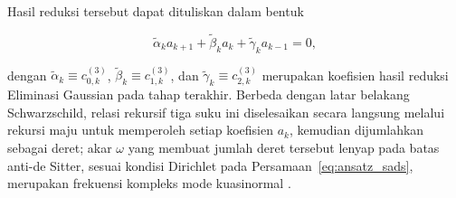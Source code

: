 Hasil reduksi tersebut dapat dituliskan dalam bentuk

\begin{equation}
    \tilde{\alpha}_k a_{k+1}
    +
    \tilde{\beta}_k a_k
    +
    \tilde{\gamma}_k a_{k-1}
    =0,
\end{equation}

dengan $\tilde{\alpha}_k \equiv c_{0,k}^{(3)}$, $\tilde{\beta}_k \equiv c_{1,k}^{(3)}$, dan $\tilde{\gamma}_k \equiv c_{2,k}^{(3)}$ merupakan koefisien hasil reduksi Eliminasi Gaussian pada tahap terakhir. Berbeda dengan latar belakang Schwarzschild, relasi rekursif tiga suku ini diselesaikan secara langsung melalui rekursi maju untuk memperoleh setiap koefisien $a_k$, kemudian dijumlahkan sebagai deret; akar $\omega$ yang membuat jumlah deret tersebut lenyap pada batas anti-de Sitter, sesuai kondisi Dirichlet pada Persamaan~\eqref{eq:ansatz_sads}, merupakan frekuensi kompleks mode kuasinormal \parencite{Horowitz2000}.